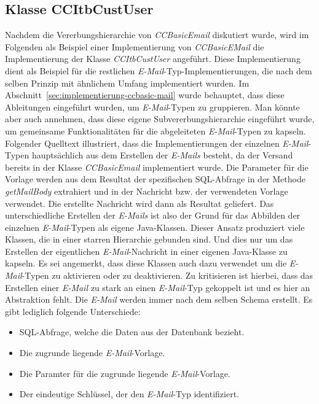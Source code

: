 \subsection{Klasse CCItbCustUser}
Nachdem die Vererbungshierarchie von \emph{CCBasicEmail} diskutiert wurde, wird im Folgenden als Beispiel einer Implementierung von \emph{CCBasicEMail} die Implementierung der Klasse \emph{CCItbCustUser} angeführt. Diese Implementierung dient als Beispiel für die restlichen \emph{E-Mail}-Typ-Implementierungen, die nach dem selben Prinzip mit ähnlichem Umfang implementiert wurden. Im Abschnitt~\ref{sec:implementierung-ccbasic-mail} wurde behauptet, dass diese Ableitungen eingeführt wurden, um \emph{E-Mail}-Typen zu gruppieren. Man könnte aber auch annehmen, dass diese eigene Subvererbungshierarchie eingeführt wurde, um gemeinsame Funktionalitäten für die abgeleiteten \emph{E-Mail}-Typen zu kapseln. 
\newline
\newline
Folgender Quelltext illustriert, dass die Implementierungen der einzelnen \emph{E-Mail}-Typen hauptsächlich aus dem Erstellen der \emph{E-Mails} besteht, da der Versand bereits in der Klasse \emph{CCBasicEmail} implementiert wurde. Die Parameter für die Vorlage werden aus dem Resultat der spezifischen SQL-Abfrage in der Methode \emph{getMailBody} extrahiert und in der Nachricht bzw. der verwendeten Vorlage verwendet. Die erstellte Nachricht wird dann als Resultat geliefert. Das unterschiedliche Erstellen der \emph{E-Mails} ist also der Grund für das Abbilden der einzelnen \emph{E-Mail}-Typen als eigene Java-Klassen. Dieser Ansatz produziert viele Klassen, die in einer starren Hierarchie gebunden sind. Und dies nur um das Erstellen der eigentlichen \emph{E-Mail}-Nachricht in einer eigenen Java-Klasse zu kapseln. Es sei angemerkt, dass diese Klassen auch dazu verwendet um die \emph{E-Mail}-Typen zu aktivieren oder zu deaktivieren. Zu kritisieren ist hierbei, dass das Erstellen einer \emph{E-Mail} zu stark an einen \emph{E-Mail}-Typ gekoppelt ist und es hier an Abstraktion fehlt. Die \emph{E-Mail} werden immer nach dem selben Schema erstellt. Es gibt lediglich folgende Unterschiede:
\begin{itemize}
	\item SQL-Abfrage, welche die Daten aus der Datenbank bezieht.
	\item Die zugrunde liegende \emph{E-Mail}-Vorlage.
	\item Die Paramter für die zugrunde liegende \emph{E-Mail}-Vorlage.
	\item Der eindeutige Schlüssel, der den \emph{E-Mail}-Typ identifiziert.
\end{itemize}
